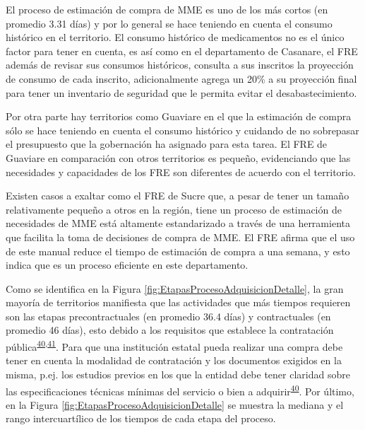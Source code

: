 \documentclass[
]{book}
\begin{document}
El proceso de estimación de compra de MME es uno de los más cortos (en promedio 3.31 días) y por lo general se hace teniendo en cuenta el consumo histórico en el territorio. El consumo histórico de medicamentos no es el único factor para tener en cuenta, es así como en el departamento de Casanare, el FRE además de revisar sus consumos históricos, consulta a sus inscritos la proyección de consumo de cada inscrito, adicionalmente agrega un 20\% a su proyección final para tener un inventario de seguridad que le permita evitar el desabastecimiento.

Por otra parte hay territorios como Guaviare en el que la estimación de compra sólo se hace teniendo en cuenta el consumo histórico y cuidando de no sobrepasar el presupuesto que la gobernación ha asignado para esta tarea. El FRE de Guaviare en comparación con otros territorios es pequeño, evidenciando que las necesidades y capacidades de los FRE son diferentes de acuerdo con el territorio.

Existen casos a exaltar como el FRE de Sucre que, a pesar de tener un tamaño relativamente pequeño a otros en la región, tiene un proceso de estimación de necesidades de MME está altamente estandarizado a través de una herramienta que facilita la toma de decisiones de compra de MME. El FRE afirma que el uso de este manual reduce el tiempo de estimación de compra a una semana, y esto indica que es un proceso eficiente en este departamento.

Como se identifica en la Figura \ref{fig:EtapasProcesoAdquisicionDetalle}, la gran mayoría de territorios manifiesta que las actividades que más tiempos requieren son las etapas precontractuales (en promedio 36.4 días) y contractuales (en promedio 46 días), esto debido a los requisitos que establece la contratación pública\textsuperscript{\protect\hyperlink{ref-CongresodelaRepublicadeColombia1993}{40},\protect\hyperlink{ref-CongresodelaRepublicadeColombia2007}{41}}. Para que una institución estatal pueda realizar una compra debe tener en cuenta la modalidad de contratación y los documentos exigidos en la misma, p.ej. los estudios previos en los que la entidad debe tener claridad sobre las especificaciones técnicas mínimas del servicio o bien a adquirir\textsuperscript{\protect\hyperlink{ref-CongresodelaRepublicadeColombia1993}{40}}. Por último, en la Figura \ref{fig:EtapasProcesoAdquisicionDetalle} se muestra la mediana y el rango intercuartílico de los tiempos de cada etapa del proceso.
\end{document}
